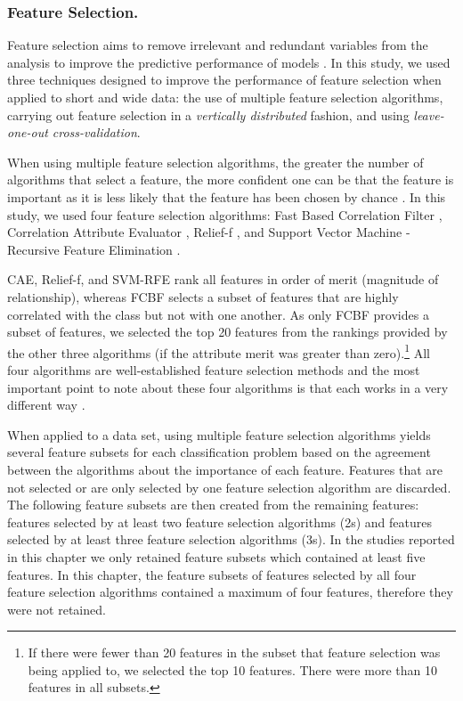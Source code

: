 \documentclass[
  12pt,
  a4paper,
]{book}
\begin{document}
\hypertarget{ml-pra-method-feature-selection}{%
\subsubsection{Feature Selection.}\label{ml-pra-method-feature-selection}}

Feature selection aims to remove irrelevant and redundant variables from the analysis to improve the predictive performance of models \citep{Guyon2003}. In this study, we used three techniques designed to improve the performance of feature selection when applied to short and wide data: the use of multiple feature selection algorithms, carrying out feature selection in a \emph{vertically distributed} fashion, and using \emph{leave-one-out cross-validation}.

When using multiple feature selection algorithms, the greater the number of algorithms that select a feature, the more confident one can be that the feature is important as it is less likely that the feature has been chosen by chance \citep{Visa2011}. In this study, we used four feature selection algorithms: Fast Based Correlation Filter \citep[FCBF;][]{Yu2003}, Correlation Attribute Evaluator \citep[CAE;][]{Bouckaert2018}, Relief-f \citep{Kira1992}, and Support Vector Machine - Recursive Feature Elimination \citep[SVM-RFE;][]{Guyon2002}.

CAE, Relief-f, and SVM-RFE rank all features in order of merit (magnitude of relationship), whereas FCBF selects a subset of features that are highly correlated with the class but not with one another. As only FCBF provides a subset of features, we selected the top 20 features from the rankings provided by the other three algorithms (if the attribute merit was greater than zero).\footnote{If there were fewer than 20 features in the subset that feature selection was being applied to, we selected the top 10 features. There were more than 10 features in all subsets.} All four algorithms are well-established feature selection methods and the most important point to note about these four algorithms is that each works in a very different way \citep[see][]{Bolon-Canedo2015}.

When applied to a data set, using multiple feature selection algorithms yields several feature subsets for each classification problem based on the agreement between the algorithms about the importance of each feature. Features that are not selected or are only selected by one feature selection algorithm are discarded. The following feature subsets are then created from the remaining features: features selected by at least two feature selection algorithms (2s) and features selected by at least three feature selection algorithms (3s). In the studies reported in this chapter we only retained feature subsets which contained at least five features. In this chapter, the feature subsets of features selected by all four feature selection algorithms contained a maximum of four features, therefore they were not retained.
\end{document}
